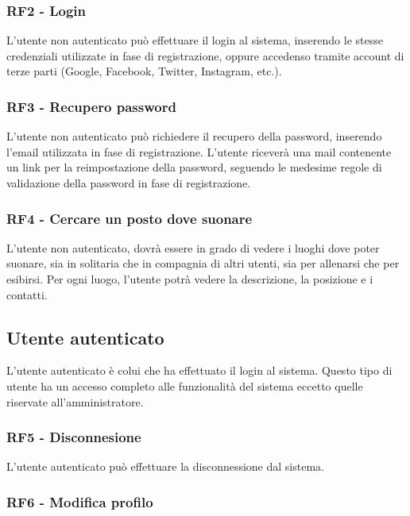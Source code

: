 \documentclass[12pt, a4paper]{article}
\begin{document}
\subsubsection{RF2 - Login}

L'utente non autenticato può effettuare il login al sistema, inserendo le stesse credenziali utilizzate in fase di registrazione, oppure accedenso tramite account di terze parti (Google, Facebook, Twitter, Instagram, etc.).

\subsubsection{RF3 - Recupero password}

L'utente non autenticato può richiedere il recupero della password, inserendo l'email utilizzata in fase di registrazione. L'utente riceverà una mail contenente un link per la reimpostazione della password, seguendo le medesime regole di validazione della password in fase di registrazione.

\subsubsection{RF4 - Cercare un posto dove suonare}

L'utente non autenticato, dovrà essere in grado di vedere i luoghi dove poter suonare, sia in solitaria che in compagnia di altri utenti, sia per allenarsi che per esibirsi. Per ogni luogo, l'utente potrà vedere la descrizione, la posizione e i contatti.

\newpage
\subsection{Utente autenticato}

L'utente autenticato è colui che ha effettuato il login al sistema. Questo tipo di utente ha un accesso completo alle funzionalità del sistema eccetto quelle riservate all'amministratore.

\subsubsection{RF5 - Disconnesione}

L'utente autenticato può effettuare la disconnessione dal sistema.

\subsubsection{RF6 - Modifica profilo}
\end{document}
